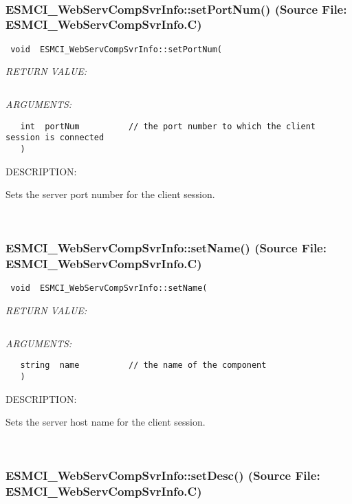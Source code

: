 \mbox{}\hrulefill\
 
\subsubsection{ESMCI\_WebServCompSvrInfo::setPortNum() (Source File: ESMCI\_WebServCompSvrInfo.C)}


  
\begin{verbatim} void  ESMCI_WebServCompSvrInfo::setPortNum(\end{verbatim}{\em RETURN VALUE:}
\begin{verbatim} \end{verbatim}{\em ARGUMENTS:}
\begin{verbatim}   int  portNum          // the port number to which the client session is connected
   )\end{verbatim}
{\sf DESCRIPTION:\\ }


      Sets the server port number for the client session.
   
 
\mbox{}\hrulefill\
 
\subsubsection{ESMCI\_WebServCompSvrInfo::setName() (Source File: ESMCI\_WebServCompSvrInfo.C)}


  
\begin{verbatim} void  ESMCI_WebServCompSvrInfo::setName(\end{verbatim}{\em RETURN VALUE:}
\begin{verbatim} \end{verbatim}{\em ARGUMENTS:}
\begin{verbatim}   string  name          // the name of the component
   )\end{verbatim}
{\sf DESCRIPTION:\\ }


      Sets the server host name for the client session.
   
 
\mbox{}\hrulefill\
 
\subsubsection{ESMCI\_WebServCompSvrInfo::setDesc() (Source File: ESMCI\_WebServCompSvrInfo.C)}


